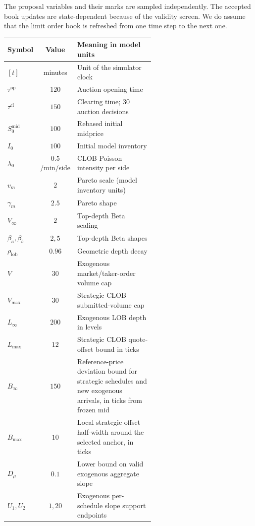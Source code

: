 \documentclass[11pt]{article}
\begin{document}
The proposal variables and their marks are sampled independently. The accepted book updates are state-dependent because of the validity screen. We do assume that the limit order book is refreshed from one time step to the next one.\vspace{0.5em}

\begingroup
\begin{table}[ht!]


\centering

\setlength{\tabcolsep}{4pt}
\begin{tabular}{lcp{0.59\linewidth}}
\toprule
\textbf{Symbol} & \textbf{Value} & \textbf{Meaning in model units} \\
\midrule
$[t]$ & minutes & Unit of the simulator clock \\
$\tau^{\mathrm{op}}$ & $120$ & Auction opening time \\
$\tau^{\mathrm{cl}}$ & $150$ & Clearing time; 30 auction decisions \\
$S_0^{\mathrm{mid}}$ & $100$ & Rebased initial midprice \\
$I_0$ & $100$ & Initial model inventory \\
$\lambda_0$ & $0.5$/min/side & CLOB Poisson intensity per side \\
$v_m$ & $2$ & Pareto scale (model inventory units) \\
$\gamma_m$ & $2.5$ & Pareto shape \\
$V_\infty$ & $2$ & Top-depth Beta scaling \\
$\beta_a,\beta_b$ & $2,5$ & Top-depth Beta shapes \\
$\rho_{\mathrm{lob}}$ & $0.96$ & Geometric depth decay \\
$V$ & $30$ & Exogenous market/taker-order volume cap \\
$V_{\max}$ & $30$ & Strategic CLOB submitted-volume cap \\
$L_\infty$ & $200$ & Exogenous LOB depth in levels \\
$L_{\max}$ & $12$ & Strategic CLOB quote-offset bound in ticks \\
$B_\infty$ & $150$ & Reference-price deviation bound for strategic schedules and new exogenous arrivals, in ticks from frozen mid \\
$B_{\max}$ & $10$ & Local strategic offset half-width around the selected anchor, in ticks \\
$D_\mu$ & $0.1$ & Lower bound on valid exogenous aggregate slope \\
$U_1,U_2$ & $1,20$ & Exogenous per-schedule slope support endpoints \\

\end{tabular}
\end{table}
\end{document}
